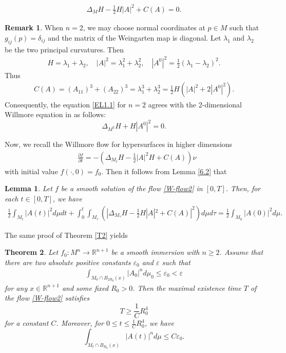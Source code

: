 \documentclass{amsart}
\newtheorem{theorem}{Theorem}[section]
\newtheorem{lemma}[theorem]{Lemma}
\theoremstyle{definition}
\newtheorem{remark}{Remark}
\numberwithin{equation}{section}
\begin{document}
	\begin{align}\label{EL1.1}
\Delta_{M} H-\frac{1}{2}H|A|^2+C(A)=0.
	\end{align}
	\begin{remark} When $n=2$, we may choose normal coordinates at $p\in M$ such that $g_{ij}(p)=\delta_{ij}$ and the matrix of the Weingarten map is diagonal.  Let $\lambda_1$ and $\lambda_2$ be the two principal curvatures. Then
\begin{align*}
	H= \lambda_1+\lambda_2, \quad|A|^2=\lambda_1^2+\lambda_2^2,\quad|A^0|^2=\frac{1}{2}(\lambda_1-\lambda_2)^2.
	\end{align*}	
	 Thus
	\begin{align*}
	C(A)
=(A_{11})^3+(A_{22})^3=\lambda_1^3+\lambda_2^3
=\frac{1}{2}H(|A|^2+2|A^0|^2).
	\end{align*}
	Consequently, the equation \eqref{EL1.1} for $n=2$ agrees with the 2-dimensional Willmore equation in  \cite{KS2} as follows:
	$$\Delta_{M^2} H + H|A^0|^2 =0.$$
	\end{remark}	

Now, we recall the Willmore flow for  hypersurfaces in higher dimensions
\begin{align} \label{W-flow2}
  &\frac{\partial f}{\partial t}  = -\left(\Delta_{M_t} H-\frac{1}{2}\vert A\vert^2 H+C(A)\right) \nu
   \end{align}
with initial value $f \left( \cdot, 0 \right)=f_{0}$.
Then it follows from Lemma \ref{6.2} that
\begin{lemma}
	Let  $f$ be a smooth solution of   the flow \eqref{W-flow2} in $[0,T]$. Then, for each $t\in [0, T]$, we have
	\begin{align} \label{ID}
\frac 12 \int_{M_t} |A(t)|^2 d\mu dt +\int_0^t\int_{M_{\tau}} (|\Delta_{M_{\tau}} H-\frac 12H|A|^2+ C(A)|^2) d\mu d\tau
=\frac 12 \int_{M_0} |A(0)|^2 d\mu .
	\end{align}
\end{lemma}



The same proof of Theorem \ref{T2} yields

\begin{theorem} \label{T5}
Let $f_0: M^n \rightarrow \mathbb{R}^{n+1}$ be a smooth  immersion with $n\geq 2$.
Assume that there are two absolute positive constants $\varepsilon_0 $ and $\varepsilon$  such
that
 \begin{align} \label{C6}
\int_{M_0\cap  B_{2R_0}(x) } \left| A_{0} \right|^{n} d\mu_{0} \leq \varepsilon_{0}< \varepsilon
 \end{align}
for any $x\in \mathbb{R}^{n+1}$ and some fixed  $R_0>0$.  Then the maximal
existence time $T$ of the flow \eqref{W-flow2}  satisfies
$$T \geq \frac{1}{C} R_0^4$$ for a constant $C$.
Moreover, for $0 \leq t \leq \frac{1}{C} R_0^4$, we have
$$\int_{M_t\cap B_{R_0} (x)} \left| A(t) \right|^{n} d\mu \leq C \varepsilon_0 \mbox{.}$$
\end{theorem}
\end{document}
